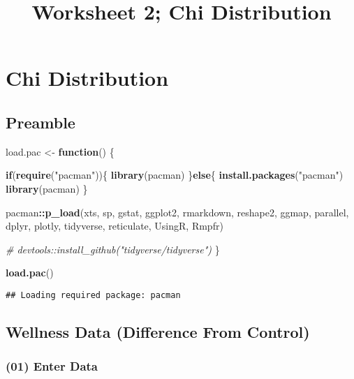 \documentclass[
]{article}
\title{Worksheet 2; Chi Distribution}
\author{}
\date{\vspace{-2.5em}}
\newenvironment{Shaded}{\begin{snugshade}}{\end{snugshade}}
\newcommand{\CommentTok}[1]{\textcolor[rgb]{0.56,0.35,0.01}{\textit{#1}}}
\newcommand{\ControlFlowTok}[1]{\textcolor[rgb]{0.13,0.29,0.53}{\textbf{#1}}}
\newcommand{\KeywordTok}[1]{\textcolor[rgb]{0.13,0.29,0.53}{\textbf{#1}}}
\newcommand{\NormalTok}[1]{#1}
\newcommand{\OperatorTok}[1]{\textcolor[rgb]{0.81,0.36,0.00}{\textbf{#1}}}
\newcommand{\StringTok}[1]{\textcolor[rgb]{0.31,0.60,0.02}{#1}}
\begin{document}
\maketitle

\hypertarget{chi-distribution}{%
\section{Chi Distribution}\label{chi-distribution}}

\hypertarget{preamble}{%
\subsection{Preamble}\label{preamble}}

\begin{Shaded}
\begin{Highlighting}[]
\NormalTok{load.pac <{-}}\StringTok{ }\ControlFlowTok{function}\NormalTok{() \{}
  
  \ControlFlowTok{if}\NormalTok{(}\KeywordTok{require}\NormalTok{(}\StringTok{"pacman"}\NormalTok{))\{}
    \KeywordTok{library}\NormalTok{(pacman)}
\NormalTok{  \}}\ControlFlowTok{else}\NormalTok{\{}
    \KeywordTok{install.packages}\NormalTok{(}\StringTok{"pacman"}\NormalTok{)}
    \KeywordTok{library}\NormalTok{(pacman)}
\NormalTok{  \}}
  
\NormalTok{  pacman}\OperatorTok{::}\KeywordTok{p\_load}\NormalTok{(xts, sp, gstat, ggplot2, rmarkdown, reshape2, ggmap,}
\NormalTok{                 parallel, dplyr, plotly, tidyverse, reticulate, UsingR, Rmpfr)}
  
\CommentTok{\#  devtools::install\_github("tidyverse/tidyverse")}
\NormalTok{\}}

\KeywordTok{load.pac}\NormalTok{()}
\end{Highlighting}
\end{Shaded}

\begin{verbatim}
## Loading required package: pacman
\end{verbatim}

\hypertarget{wellness-data-difference-from-control}{%
\subsection{Wellness Data (Difference From
Control)}\label{wellness-data-difference-from-control}}

\hypertarget{enter-data}{%
\subsubsection{(01) Enter Data}\label{enter-data}}
\end{document}
